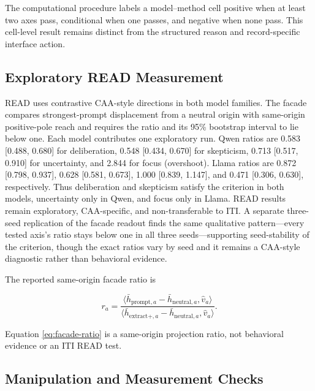 \documentclass[manuscript,review,anonymous]{acmart}
\begin{document}
The computational procedure labels a model--method cell positive when at least two axes pass, conditional when one passes, and negative when none pass. {}%
This cell-level result remains distinct from the structured reason and record-specific interface action.

\subsection{Exploratory READ Measurement}\label{exploratory-read-measurement}

READ uses contrastive CAA-style directions in both model families. {}%
The facade compares strongest-prompt displacement from a neutral origin with same-origin positive-pole reach and requires the ratio and its 95\% bootstrap interval to lie below one. {}%
Each model contributes one exploratory run. {}%
Qwen ratios are 0.583 {[}0.488, 0.680{]} for deliberation, 0.548 {[}0.434, 0.670{]} for skepticism, 0.713 {[}0.517, 0.910{]} for uncertainty, and 2.844 for focus (overshoot). Llama ratios are 0.872 {[}0.798, 0.937{]}, 0.628 {[}0.581, 0.673{]}, 1.000 {[}0.839, 1.147{]}, and 0.471 {[}0.306, 0.630{]}, respectively. Thus deliberation and skepticism satisfy the criterion in both models, uncertainty only in Qwen, and focus only in Llama. {}%
{}%
READ results remain exploratory, CAA-specific, and non-transferable to ITI. A separate three-seed replication of the facade readout finds the same qualitative pattern---every tested axis's ratio stays below one in all three seeds---supporting seed-stability of the criterion, though the exact ratios vary by seed and it remains a CAA-style diagnostic rather than behavioral evidence.

The reported same-origin facade ratio is

\begin{equation}
r_a=\frac{\langle\bar h_{\mathrm{prompt},a}-\bar h_{\mathrm{neutral},a},\hat v_a\rangle}
{\langle\bar h_{\mathrm{extract}+,a}-\bar h_{\mathrm{neutral},a},\hat v_a\rangle}.
\label{eq:facade-ratio}
\end{equation}


Equation \ref{eq:facade-ratio} is a same-origin projection ratio, not behavioral evidence or an ITI READ test.

\subsection{Manipulation and Measurement Checks}\label{manipulation-and-measurement-checks}
\end{document}
